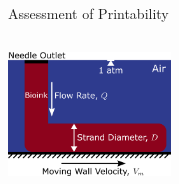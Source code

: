 \begin{frame}{Assessment of Printability}
\begin{columns}
\centering

\includegraphics[trim = 0mm 0mm 0mm 0mm, clip, width=1.70in]{images/printability_setup.png}\\
\end{columns}
\addtocounter{footnote}{-1}
\end{frame}

